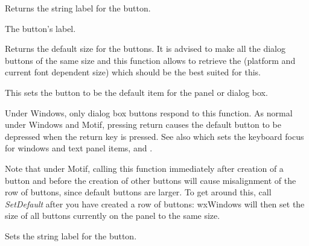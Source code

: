 Returns the string label for the button.


The button's label.



\label{wxbuttongetdefaultsize}


Returns the default size for the buttons. It is advised to make all the dialog
buttons of the same size and this function allows to retrieve the (platform and
current font dependent size) which should be the best suited for this.

\label{wxbuttonsetdefault}


This sets the button to be the default item for the panel or dialog
box.


Under Windows, only dialog box buttons respond to this function.  As
normal under Windows and Motif, pressing return causes the default button to
be depressed when the return key is pressed. See also \rtfsp
which sets the keyboard focus for windows and text panel items,\rtfsp
and .

Note that under Motif, calling this function immediately after
creation of a button and before the creation of other buttons
will cause misalignment of the row of buttons, since default
buttons are larger. To get around this, call {\it SetDefault}\rtfsp
after you have created a row of buttons: wxWindows will
then set the size of all buttons currently on the panel to
the same size.

\label{wxbuttonsetlabel}


Sets the string label for the button.





